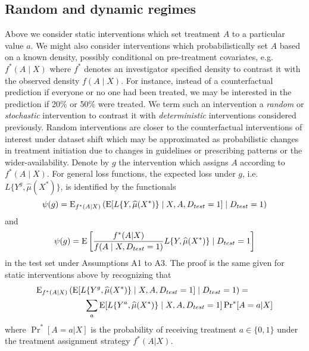     \subsection{Random and dynamic regimes}\label{sec:randomdynamic}
    Above we consider static interventions which set treatment $A$ to a particular value $a$. We might also consider interventions which probabilistically set $A$ based on a known density, possibly conditional on pre-treatment covariates, e.g. $f^*(A \mid X)$ where $f^*$ denotes an investigator specified density to contrast it with the observed density $f(A\mid X)$. For instance, instead of a counterfactual prediction if everyone or no one had been treated, we may be interested in the prediction if 20\% or 50\% were treated. We term such an intervention a \textit{random} or \textit{stochastic} intervention to contrast it with \textit{deterministic} interventions considered previously. Random interventions are closer to the counterfactual interventions of interest under dataset shift which may be approximated as probabilistic changes in treatment initiation due to changes in guidelines or prescribing patterns or the wider-availability. Denote by $g$ the intervention which assigns $A$ according to $f^*(A \mid X)$. For general loss functions, the expected loss under $g$, i.e. $L\{Y^{g}, \widehat{\mu}(X^*)\}$, is identified by the functionals
    \begin{equation}\label{eqn:rand_cl_estimand}
        \psi(g) = \operatorname{E}_{f^*(A|X)}\left(\operatorname{E}[L\{Y, \widehat{\mu}(X^*)\} \mid X, A, D_{test} = 1] \mid D_{test} = 1\right)
    \end{equation}
    and 
    \begin{equation}\label{eqn:rand_ipw_estimand}
        \psi(g) = \operatorname{E}\left[\frac{f^*(A|X)}{f(A \mid X, D_{test} = 1)}L\{Y, \widehat{\mu}(X^*)\} \mid D_{test} = 1\right]
    \end{equation}
    in the test set under Assumptions A1 to A3. The proof is the same given for static interventions above by recognizing that 
    \begin{align*}
        \operatorname{E}_{f^*(A|X)}&\left(\operatorname{E}[L\{Y^g, \widehat{\mu}(X^*)\} \mid X, A, D_{test} = 1] \mid D_{test} = 1\right) = \\
        &\qquad \sum_a\operatorname{E}[L\{Y^a, \widehat{\mu}(X^*)\} \mid X, A, D_{test} = 1]\operatorname{Pr}^*[A=a|X]
    \end{align*}
    where $\operatorname{Pr}^*[A=a|X]$ is the probability of receiving treatment $a \in \{0,1\}$ under the treatment assignment strategy $f^*(A|X)$.

